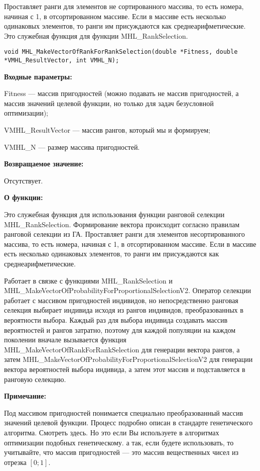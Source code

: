 \documentclass[a4paper,12pt]{article}
\begin{document}
Проставляет ранги для элементов не сортированного массива, то есть номера, начиная с 1, в отсортированном массиве.  Если в массиве есть несколько одинаковых элементов, то ранги им присуждаются как среднеарифметические. Это служебная функция для функции MHL\_RankSelection.


\begin{lstlisting}[label=code_syntax_MHL_MakeVectorOfRankForRankSelection,caption=Синтаксис]
void MHL_MakeVectorOfRankForRankSelection(double *Fitness, double *VMHL_ResultVector, int VMHL_N);
\end{lstlisting}

\textbf{Входные параметры:}

Fitness --- массив пригодностей (можно подавать не массив пригодностей, а массив значений целевой функции, но только для задач безусловной оптимизации);
 
VMHL\_ResultVector --- массив рангов, который мы и формируем;
 
VMHL\_N --- размер массива пригодностей.

\textbf{Возвращаемое значение:} 
 
Отсутствует.
 
\textbf{О функции:}

Это служебная функция для использования функции ранговой селекции MHL\_RankSelection. Формирование вектора происходит согласно правилам ранговой селекции из ГА. Проставляет ранги для элементов несортированного массива, то есть номера, начиная с 1, в отсортированном массиве. Если в массиве есть несколько одинаковых элементов, то ранги им присуждаются как среднеарифметические.

Работает в связке с функциями MHL\_RankSelection и MHL\_MakeVectorOfProbabilityForProportionalSelectionV2. Оператор селекции работает с массивом пригодностей индивидов, но непосредственно ранговая селекция выбирает индивида исходя из рангов индивидов, преобразованных в вероятности выбора. Каждый раз для выбора индивида создавать массив вероятностей и рангов затратно, поэтому для каждой популяции на каждом поколении вначале вызывается функция MHL\_MakeVectorOfRankForRankSelection для генерации вектора рангов, а затем MHL\_MakeVectorOfProbabilityForProportionalSelectionV2 для генерации вектора вероятностей выбора индивида, а затем этот массив и подставляется в ранговую селекцию.

\textbf{Примечание:}

 Под массивом пригодностей понимается специально преобразованный массив значений целевой функции. Процесс подробно описан в стандарте генетического алгоритма. Смотреть здесь. Но это если Вы используете в алгоритмах оптимизации подобных генетическому. а так, если будете использовать, то учитывайте, что массив пригодностей --- это массив вещественных чисел из отрезка $[0;1]$.
\end{document}
